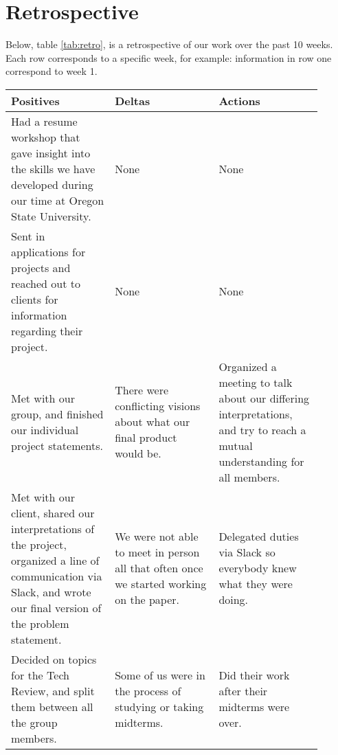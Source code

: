 \section{Retrospective}
Below, table \ref{tab:retro}, is a retrospective of our work over the past 10 weeks. Each row corresponds to a specific week, for example: information in row one correspond to week 1.
\begin{table}[!ht]
    \centering
    \begin{tabular}{|p{0.3\linewidth} | p{0.3\linewidth} | p{0.3\linewidth} |}
    \hline
        \textbf{Positives}& \textbf{Deltas} & \textbf{Actions}  \\ \hline
        
        Had a resume workshop that gave insight into the skills we have developed during our time at Oregon State University.& None & None \\ \hline
        
        Sent in applications for projects and reached out to clients for information regarding their project.& None & None \\ \hline
        
        Met with our group, and finished our individual project statements.& There were conflicting visions about what our final product would be. & Organized a meeting to talk about our differing interpretations, and try to reach a mutual understanding for all members. \\ \hline
        
        Met with our client, shared our interpretations of the project, organized a line of communication via Slack, and wrote our final version of the problem statement.& We were not able to meet in person all that often once we started working on the paper. & Delegated duties via Slack so everybody knew what they were doing. \\ \hline
        
        Decided on topics for the Tech Review, and split them between all the group members.& Some of us were in the process of studying or taking midterms. & Did their work after their midterms were over. \\ \hline
        

\end{tabular}
\end{table}
